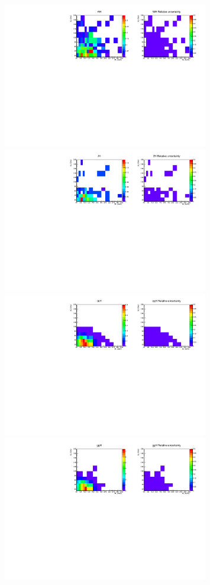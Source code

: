 % 
% 
\begin{figure}[htp]
\centering
\includegraphics[width=0.8\textwidth]{figures/2dtemplate_WH_mH125_1j.pdf}
\includegraphics[width=0.8\textwidth]{figures/2dtemplate_ZH_mH125_1j.pdf}
\includegraphics[width=0.8\textwidth]{figures/2dtemplate_qqH_mH125_1j.pdf}
\includegraphics[width=0.8\textwidth]{figures/2dtemplate_ggH_mH125_1j.pdf}

\end{figure}
